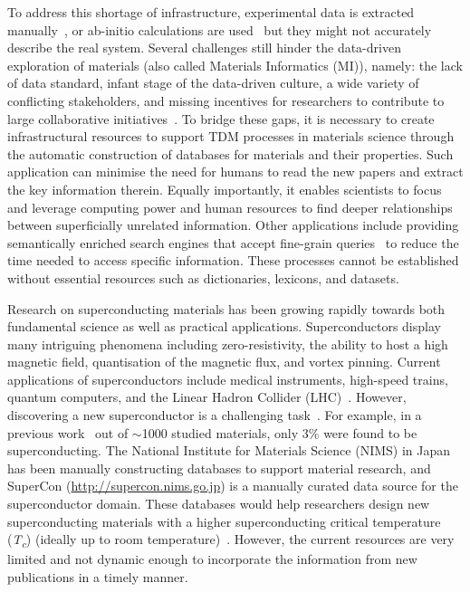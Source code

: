 \documentclass[12pt, a4paper]{report}
\begin{document}
To address this shortage of infrastructure, experimental data is extracted manually~\cite{doi:10.1021/cm400893e}, or ab-initio calculations are used~\cite{Jain2013CommentaryTM_materialsProject} but they might not accurately describe the real system.
Several challenges still hinder the data-driven exploration of materials (also called Materials Informatics (MI)), namely: the lack of data standard, infant stage of the data-driven culture, a wide variety of conflicting stakeholders, and missing incentives for researchers to contribute to large collaborative initiatives~\cite{Hill2016MaterialsSW}. 
To bridge these gaps, it is necessary to create infrastructural resources to support TDM processes in materials science through the automatic construction of databases for materials and their properties. 
Such application can minimise the need for humans to read the new papers and extract the key information therein. 
Equally importantly, it enables scientists to focus and leverage computing power and human resources to find deeper relationships between superficially unrelated information. 
Other applications include providing semantically enriched search engines that accept fine-grain queries~\cite{Liu2019SurfaceMR} to reduce the time needed to access specific information. 
These processes cannot be established without essential resources such as dictionaries, lexicons, and datasets. 

Research on superconducting materials has been growing rapidly towards both fundamental science as well as practical applications. Superconductors display many intriguing phenomena including zero-resistivity, the ability to host a high magnetic field, quantisation of the magnetic flux, and vortex pinning.  
Current applications of superconductors include medical instruments, high-speed trains, quantum computers, and the Linear Hadron Collider (LHC)~\cite{PhilippeBook, Kizu2010ConstructionOT, Cardani2017NewAO}. 
However, discovering a new superconductor is a challenging task~\cite{PhysRevB.103.014509}. For example, in a previous work~\cite{doi:10.1088/1468-6996/16/3/033503} out of $\sim$1000 studied materials, only 3\% were found to be superconducting. 
The National Institute for Materials Science (NIMS) in Japan has been manually constructing databases to support material research, and SuperCon (\url{http://supercon.nims.go.jp}) is a manually curated data source for the superconductor domain.
These databases would help researchers design new superconducting materials with a higher superconducting critical temperature (\textit{T\textsubscript{c}}) (ideally up to room temperature)~\cite{Hamlin2019SuperconductivityNR,stanev2017machine}.
However, the current resources are very limited and not dynamic enough to incorporate the information from new publications in a timely manner. 
\end{document}
